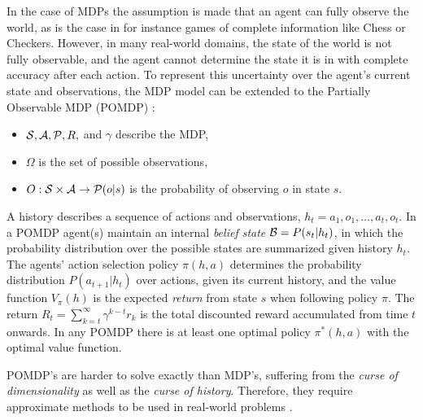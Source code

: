 \documentclass[conference]{IEEEtran}
\begin{document}
In the case of MDPs the assumption is made that an agent can fully observe the world, as is the case in for instance games of complete information like Chess or Checkers. However, in many real-world domains, the state of the world is not fully observable, and the agent cannot determine the state it is in with complete accuracy after each action. To represent this uncertainty over the agent's current state and observations, the MDP model can be extended to the Partially Observable MDP (POMDP) \cite{aastrom1965optimal,pomdp}: 

\begin{itemize}
\item $\S,\mathcal{A},\P,R,$ and $\gamma$ describe the MDP,
\item $\Omega$ is the set of possible observations,
\item $O:\S\times\mathcal{A}\to\P(o|s)$ is the probability of observing $o$ in state $s$. 
\end{itemize}

A history describes a sequence of actions and observations, $h_t = {a_1, o_1, \ldots, a_t, o_t}$. In a POMDP agent(s) maintain an internal {\it belief state} $\B = P(s_t | h_t)$, in which the probability distribution over the possible states are summarized given history $h_t$. The agents' action selection policy $\pi(h,a)$ determines the probability distribution $P(a_{t+1}|h_t)$ over actions, given its current history, and the value function $V_{\pi}(h)$ is the expected {\it return} from state $s$ when following policy $\pi$. The return $R_t = \sum\nolimits_{k=t}^{\infty} \gamma^{k−t}r_k$ is the total discounted reward accumulated from time $t$ onwards. In any POMDP there is at least one optimal policy $π^*(h, a)$ with the optimal value function.

POMDP's are harder to solve exactly than MDP's, suffering from the {\it curse of dimensionality} as well as the {\it curse of history}. Therefore, they require approximate methods to be used in real-world problems \cite{pineau2006anytime}.

\end{document}

